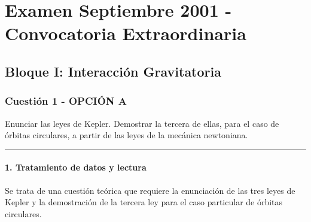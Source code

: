 \chapter{Examen Septiembre 2001 - Convocatoria Extraordinaria}
\label{chap:2001_sep_ext}

\section{Bloque I: Interacción Gravitatoria}
\label{sec:grav_2001_sep_ext}

\subsection{Cuestión 1 - OPCIÓN A}
\label{subsec:1A_2001_sep_ext}

\begin{cajaenunciado}
Enunciar las leyes de Kepler. Demostrar la tercera de ellas, para el caso de órbitas circulares, a partir de las leyes de la mecánica newtoniana.
\end{cajaenunciado}
\hrule

\subsubsection*{1. Tratamiento de datos y lectura}
Se trata de una cuestión teórica que requiere la enunciación de las tres leyes de Kepler y la demostración de la tercera ley para el caso particular de órbitas circulares.

